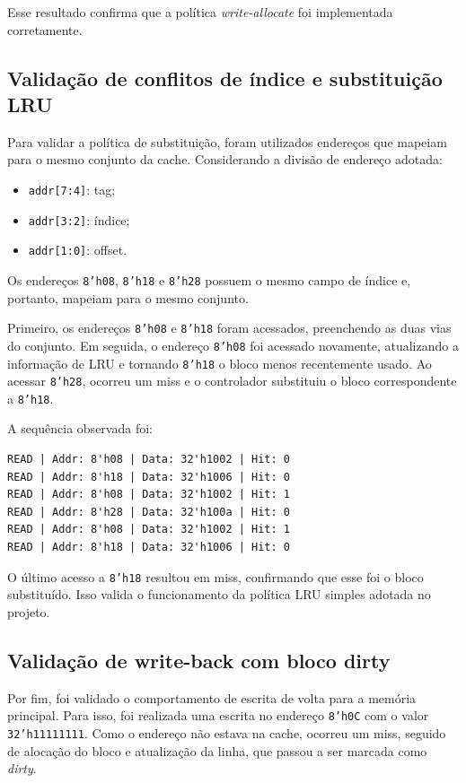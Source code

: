 ﻿\documentclass[12pt,a4paper]{article}
\begin{document}
Esse resultado confirma que a política \textit{write-allocate} foi implementada corretamente.

\subsection{Validação de conflitos de índice e substituição LRU}

Para validar a política de substituição, foram utilizados endereços que mapeiam para o mesmo conjunto da cache. Considerando a divisão de endereço adotada:

\begin{itemize}
    \item \texttt{addr[7:4]}: tag;
    \item \texttt{addr[3:2]}: índice;
    \item \texttt{addr[1:0]}: offset.
\end{itemize}

Os endereços \texttt{8'h08}, \texttt{8'h18} e \texttt{8'h28} possuem o mesmo campo de índice e, portanto, mapeiam para o mesmo conjunto.

Primeiro, os endereços \texttt{8'h08} e \texttt{8'h18} foram acessados, preenchendo as duas vias do conjunto. Em seguida, o endereço \texttt{8'h08} foi acessado novamente, atualizando a informação de LRU e tornando \texttt{8'h18} o bloco menos recentemente usado. Ao acessar \texttt{8'h28}, ocorreu um miss e o controlador substituiu o bloco correspondente a \texttt{8'h18}.

A sequência observada foi:

\begin{verbatim}
READ | Addr: 8'h08 | Data: 32'h1002 | Hit: 0
READ | Addr: 8'h18 | Data: 32'h1006 | Hit: 0
READ | Addr: 8'h08 | Data: 32'h1002 | Hit: 1
READ | Addr: 8'h28 | Data: 32'h100a | Hit: 0
READ | Addr: 8'h08 | Data: 32'h1002 | Hit: 1
READ | Addr: 8'h18 | Data: 32'h1006 | Hit: 0
\end{verbatim}

O último acesso a \texttt{8'h18} resultou em miss, confirmando que esse foi o bloco substituído. Isso valida o funcionamento da política LRU simples adotada no projeto.

\subsection{Validação de write-back com bloco dirty}

Por fim, foi validado o comportamento de escrita de volta para a memória principal. Para isso, foi realizada uma escrita no endereço \texttt{8'h0C} com o valor \texttt{32'h11111111}. Como o endereço não estava na cache, ocorreu um miss, seguido de alocação do bloco e atualização da linha, que passou a ser marcada como \textit{dirty}.
\end{document}
